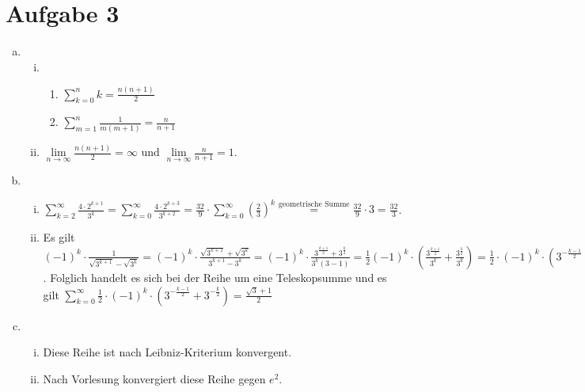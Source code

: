 \documentclass{article}
\begin{document}
    \section*{Aufgabe 3}
    \begin{enumerate}[(a)]
        \item \begin{enumerate}[(i)]
            \item \begin{enumerate}[(1)]
                \item $\sum_{k = 0}^{n} k = \frac{n(n+1)}{2}$
                \item $\sum_{m = 1}^{n} \frac{1}{m(m+1)} = \frac{n}{n+1}$
            \end{enumerate}
            \item $\lim\limits_{n\to\infty}\frac{n(n+1)}{2} = \infty$ und $\lim\limits_{n\to\infty}\frac{n}{n+1} = 1$.
        \end{enumerate}
        \item \begin{enumerate}[(i)]
            \item $\sum_{k = 2}^{\infty}\frac{4\cdot 2^{k+1}}{3^k} = \sum_{k = 0}^{\infty}\frac{4\cdot 2^{k+3}}{3^{k+2}} = \frac{32}{9}\cdot \sum_{k = 0}^{\infty}\left(\frac{2}{3}\right)^k \overset{\text{geometrische Summe}}{=} \frac{32}{9}\cdot 3 = \frac{32}{3}$.
            \item Es gilt $(-1)^k \cdot \frac{1}{\sqrt{3^{k+1}} - \sqrt{3^k}} = (-1)^k \cdot \frac{\sqrt{3^{k+1}} + \sqrt{3^k}}{3^{k+1}-3^{k}} = (-1)^k \cdot \frac{3^{\frac{k+1}{2}} + 3^{\frac{k}{2}}}{3^{k}(3-1)} = \frac{1}{2} (-1)^k \cdot \left(\frac{3^{\frac{k+1}{2}}}{3^k} + \frac{3^{\frac{k}{2}}}{3^k}\right) = \frac{1}{2} \cdot (-1)^{k} \cdot \left(3^{-\frac{k-1}{2}} + 3^{-\frac{k}{2}}\right)$. 
            Folglich handelt es sich bei der Reihe um eine Teleskopsumme und es gilt $\sum_{k = 0}^{\infty} \frac{1}{2} \cdot (-1)^{k} \cdot \left(3^{-\frac{k-1}{2}} + 3^{-\frac{k}{2}}\right) = \frac{\sqrt{3} + 1}{2}$
        \end{enumerate}
        \item \begin{enumerate}[(i)]
            \item Diese Reihe ist nach Leibniz-Kriterium konvergent.
            \item Nach Vorlesung konvergiert diese Reihe gegen $e^2$.
        \end{enumerate}
    \end{enumerate}
\end{document}
